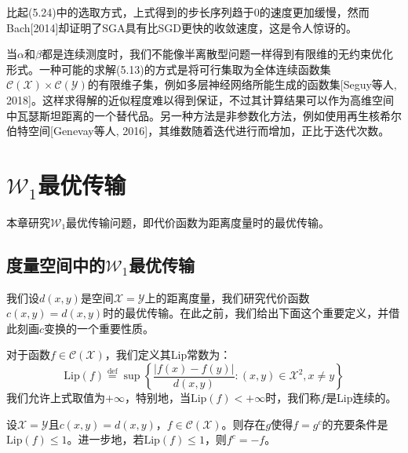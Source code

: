 \documentclass[cn,10pt,math=newtx,citestyle=gb7714-2015,bibstyle=gb7714-2015]{elegantbook}
\begin{document}
比起(5.24)中的选取方式，上式得到的步长序列趋于$0$的速度更加缓慢，然而Bach[2014]却证明了SGA具有比SGD更快的收敛速度，这是令人惊讶的。

\vspace{1.5em}

\begin{postulate}[连续-连续型最优传输]
当$\alpha$和$\beta$都是连续测度时，我们不能像半离散型问题一样得到有限维的无约束优化形式。一种可能的求解(5.13)的方式是将可行集取为全体连续函数集$\mathcal{C(X)}\times \mathcal{C(Y)}$的有限维子集，例如多层神经网络所能生成的函数集[Seguy等人, 2018]。这样求得解的近似程度难以得到保证，不过其计算结果可以作为高维空间中瓦瑟斯坦距离的一个替代品。另一种方法是非参数化方法，例如使用再生核希尔伯特空间[Genevay等人, 2016]，其维数随着迭代进行而增加，正比于迭代次数。
\end{postulate}

\chapter{$\mathcal{W}_1$最优传输}

本章研究$\mathcal{W}_1$最优传输问题，即代价函数为距离度量时的最优传输。

\section{度量空间中的$\mathcal{W}_1$最优传输}

我们设$d(x,y)$是空间$\mathcal{X}=\mathcal{Y}$上的距离度量，我们研究代价函数$c(x,y)=d(x,y)$时的最优传输。在此之前，我们给出下面这个重要定义，并借此刻画$c$变换的一个重要性质。

\begin{definition}[Lip常数与Lip连续]
    对于函数$f\in\mathcal{C(X)}$，我们定义其Lip常数为：
    \begin{equation*}
        \text{Lip}(f)\overset{\text{def}}{=}\sup\left\{ \frac{|f(x)-f(y)|}{d(x,y)} : (x,y)\in\mathcal{X}^2, x\neq y\right\}
    \end{equation*}
    我们允许上式取值为$+\infty$，特别地，当$\text{Lip}(f)<+\infty$时，我们称$f$是Lip连续的。
\end{definition}

\begin{proposition}
    设$\mathcal{X}=\mathcal{Y}$且$c(x,y)=d(x,y)$，$f\in\mathcal{C(X)}$。则存在$g$使得$f=g^c$的充要条件是$\text{Lip}(f)\leq 1$。进一步地，若$\text{Lip}(f)\leq 1$，则$f^c=-f$。
\end{proposition}
\end{document}
